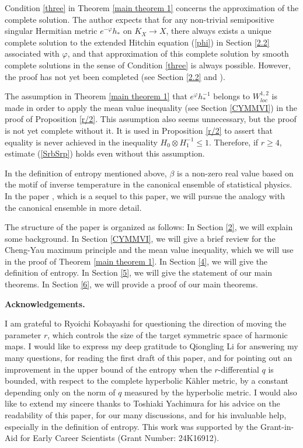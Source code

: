 \documentclass[12pt]{article}
\theoremstyle{definition}
\def\refe{\ast}
\begin{document}
Condition \ref{three} in Theorem \ref{main theorem 1} concerns the approximation of the complete solution. The author expects that for any non-trivial semipositive singular Hermitian metric $e^{-\varphi}h_\refe$ on $K_X\rightarrow X$, there always exists a unique complete solution to the extended Hitchin equation (\ref{phi}) in Section \ref{2.2} associated with $\varphi$, and that approximation of this complete solution by smooth complete solutions in the sense of Condition \ref{three} is always possible. However, the proof has not yet been completed (see Section \ref{2.2} and \cite{Miy5}).

The assumption in Theorem \ref{main theorem 1} that $e^\varphi h_\refe^{-1}$ belongs to $W^{1,2}_{loc}$ is made in order to apply the mean value inequality (see Section \ref{CYMMVI}) in the proof of Proposition \ref{r/2}. This assumption also seems unnecessary, but the proof is not yet complete without it. It is used in Proposition \ref{r/2} to assert that equality is never achieved in the inequality $H_0 \otimes H_1^{-1} \leq 1$. Therefore, if $r\geq 4$, estimate (\ref{SrbSrp}) holds even without this assumption.




In the definition of entropy mentioned above, $\beta$ is a non-zero real value based on the motif of inverse temperature in the canonical ensemble of statistical physics. In the paper \cite{Miy4}, which is a sequel to this paper, we will pursue the analogy with the canonical ensemble in more detail. 

The structure of the paper is organized as follows: In Section \ref{2}, we will explain some background. In Section \ref{CYMMVI}, we will give a brief review for the Cheng-Yau maximum principle and the mean value inequality, which we will use in the proof of Theorem \ref{main theorem 1}.
In Section \ref{4}, we will give the definition of entropy. In Section \ref{5}, we will give the statement of our main theorems. In Section \ref{6}, we will provide a proof of our main theorems. 

\medskip
\noindent
{\bf Acknowledgements.} 

\noindent
I am grateful to Ryoichi Kobayashi for questioning the direction of moving the parameter $r$, which controls the size of the target symmetric space of harmonic maps. 
I would like to express my deep gratitude to Qiongling Li for answering my many questions, for reading the first draft of this paper, and for pointing out an improvement in the upper bound of the entropy when the $r$-differential $q$ is bounded, with respect to the complete hyperbolic K\"ahler metric, by a constant depending only on the norm of $q$ measured by the hyperbolic metric. 
I would also like to extend my sincere thanks to Toshiaki Yachimura for his advice on the readability of this paper, for our many discussions, and for his invaluable help, especially in the definition of entropy. This work was supported by the Grant-in-Aid for Early Career Scientists (Grant Number: 24K16912).
\end{document}
